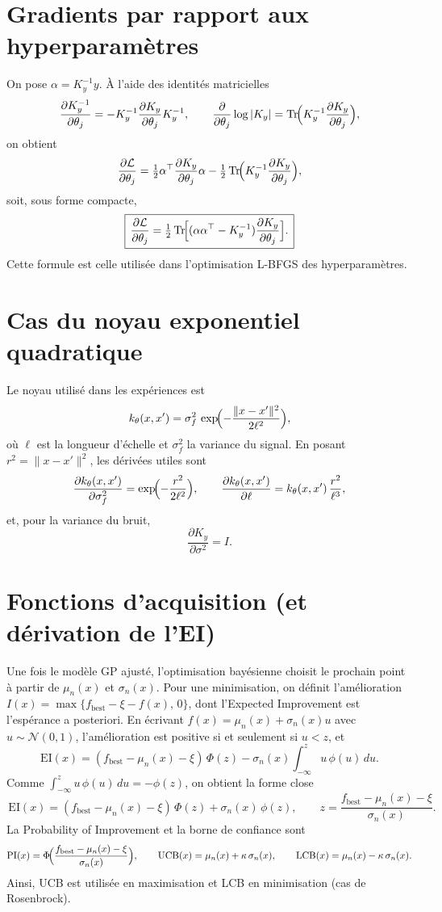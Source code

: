\documentclass[12pt]{article}
\newcommand{\N}{\mathcal{N}}
\DeclareMathOperator{\tr}{Tr}
\begin{document}
\section*{Gradients par rapport aux hyperparamètres}

On pose $\alpha = K_y^{-1} y$. À l'aide des identités matricielles
\[
\frac{\partial K_y^{-1}}{\partial \theta_j} = -K_y^{-1}\frac{\partial K_y}{\partial \theta_j}K_y^{-1},
\qquad
\frac{\partial}{\partial \theta_j}\log|K_y| = \tr\!\Bigl(K_y^{-1}\frac{\partial K_y}{\partial \theta_j}\Bigr),
\]
on obtient
\[
\frac{\partial \mathcal{L}}{\partial \theta_j}
= \tfrac12 \alpha^\top \frac{\partial K_y}{\partial \theta_j}\alpha
- \tfrac12 \tr\!\Bigl(K_y^{-1}\frac{\partial K_y}{\partial \theta_j}\Bigr),
\]
soit, sous forme compacte,
\[
\boxed{\, \frac{\partial \mathcal{L}}{\partial \theta_j}
= \tfrac12 \tr\!\Bigl[(\alpha\alpha^\top - K_y^{-1})\frac{\partial K_y}{\partial \theta_j}\Bigr]. \,}
\]
Cette formule est celle utilisée dans l'optimisation L-BFGS des hyperparamètres.

\section*{Cas du noyau exponentiel quadratique}

Le noyau utilisé dans les expériences est
\[
k_\theta(x,x') = \sigma_f^2\,\exp\!\Bigl(-\frac{\|x-x'\|^2}{2\ell^2}\Bigr),
\]
où $\ell$ est la longueur d'échelle et $\sigma_f^2$ la variance du signal. En
posant $r^2 = \|x-x'\|^2$, les dérivées utiles sont
\[
\frac{\partial k_\theta(x,x')}{\partial \sigma_f^2} = \exp\!\Bigl(-\frac{r^2}{2\ell^2}\Bigr),
\qquad
\frac{\partial k_\theta(x,x')}{\partial \ell} = k_\theta(x,x')\,\frac{r^2}{\ell^3},
\]
et, pour la variance du bruit,
\[
\frac{\partial K_y}{\partial \sigma^2} = I.
\]

\section*{Fonctions d'acquisition (et dérivation de l'EI)}

Une fois le modèle GP ajusté, l'optimisation bayésienne choisit le prochain point
à partir de $\mu_n(x)$ et $\sigma_n(x)$. Pour une minimisation, on définit
l'amélioration $I(x) = \max\{f_{\text{best}} - \xi - f(x),\, 0\}$, dont l'Expected
Improvement est l'espérance a posteriori. En écrivant $f(x)=\mu_n(x)+\sigma_n(x)u$
avec $u\sim\N(0,1)$, l'amélioration est positive si et seulement si $u<z$, et
\[
\mathrm{EI}(x) = (f_{\text{best}}-\mu_n(x)-\xi)\,\Phi(z) - \sigma_n(x)\!\int_{-\infty}^z u\,\phi(u)\,du.
\]
Comme $\int_{-\infty}^z u\,\phi(u)\,du = -\phi(z)$, on obtient la forme close
\[
\boxed{\, \mathrm{EI}(x) = (f_{\text{best}} - \mu_n(x) - \xi)\,\Phi(z) + \sigma_n(x)\,\phi(z),
\qquad z = \frac{f_{\text{best}} - \mu_n(x) - \xi}{\sigma_n(x)}. \,}
\]
La Probability of Improvement et la borne de confiance sont
\[
\mathrm{PI}(x) = \Phi\!\Bigl(\frac{f_{\text{best}} - \mu_n(x) - \xi}{\sigma_n(x)}\Bigr),
\qquad
\mathrm{UCB}(x) = \mu_n(x) + \kappa\,\sigma_n(x),
\qquad
\mathrm{LCB}(x) = \mu_n(x) - \kappa\,\sigma_n(x).
\]
Ainsi, UCB est utilisée en maximisation et LCB en minimisation (cas de
Rosenbrock).
\end{document}
